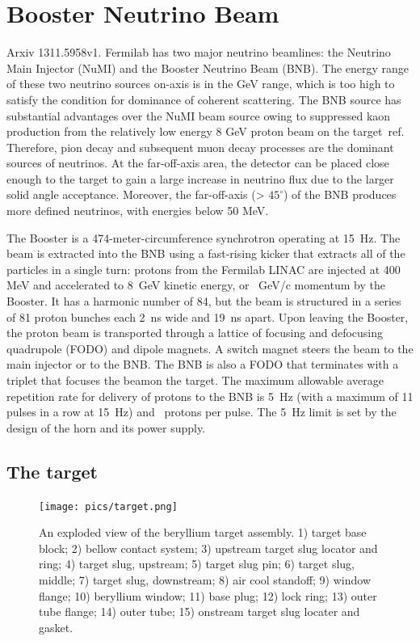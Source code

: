 
\chapter{Booster Neutrino Beam}
\label{app:A}

 Arxiv 1311.5958v1.
 Fermilab has two major neutrino beamlines: the Neutrino Main Injector (NuMI) and %
 the Booster Neutrino Beam (BNB).
 The energy range of these two neutrino sources on-axis is in the GeV range, %
 which is too high to satisfy the condition for dominance of coherent scattering. 
 The BNB source has substantial advantages over the NuMI beam source owing to suppressed %
 kaon production from the relatively low energy 8 GeV proton beam on the target~ref. 
 Therefore, pion decay and subsequent muon decay processes are the dominant sources of neutrinos. 
 At the far-off-axis area, the detector can be placed close enough to the target to gain a %
 large increase in neutrino flux due to the larger solid angle acceptance.
 Moreover, the far-off-axis (> $45^\circ$) of the BNB produces more defined neutrinos, with %
 energies below 50 MeV.

 The Booster is a 474-meter-circumference synchrotron operating at 15~Hz. 
 The beam is extracted into the BNB using a fast-rising kicker that extracts all of the particles %
 in a single turn: protons from the Fermilab LINAC are injected at 400 MeV and accelerated to 8~GeV kinetic energy, %
 or ~GeV/c momentum by the Booster.
 It has a harmonic number of 84, but the beam is structured in a series of 81 proton bunches %
 each 2~ns wide and 19~ns apart. 
 Upon leaving the Booster, the proton beam is transported through a lattice of focusing %
 and defocusing quadrupole (FODO) and dipole magnets.
 A switch magnet steers the beam to the main injector or to the BNB. 
 The BNB is also a FODO that terminates with a triplet that focuses the beamon the target. 
 The maximum allowable average repetition rate for delivery of protons to the BNB is %
 5~Hz (with a maximum of 11 pulses in a row at 15~Hz) and ~protons per pulse. 
 The 5~Hz limit is set by the design of the horn and its power supply.

 \section{The target}
 \label{sec:targ}

 \begin{figure}[]
  \centering
  \texttt{[image: pics/target.png]}
  \caption{An exploded view of the beryllium target assembly. 1) target base block; 2) bellow contact system; %
  3) upstream target slug locator and ring; 4) target slug, upstream; 5) target slug pin; 6) target slug, middle; %
  7) target slug, downstream; 8) air cool standoff; 9) window flange; 10) beryllium window; %
  11) base plug; 12) lock ring; 13) outer tube flange; 14) outer tube; 15) onstream target slug locater and gasket.}
  \label{fig:bnbtarget}
 \end{figure}

